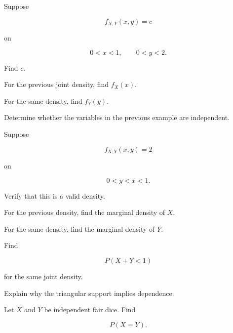\begin{exercise}[2]
Suppose

\[
f_{X,Y}(x,y)=c
\]

on

\[
0<x<1,
\qquad
0<y<2.
\]

Find \(c\).
\end{exercise}

\begin{exercise}[2]
For the previous joint density, find \(f_X(x)\).
\end{exercise}

\begin{exercise}[2]
For the same density, find \(f_Y(y)\).
\end{exercise}

\begin{exercise}[2]
Determine whether the variables in the previous example are independent.
\end{exercise}

\begin{exercise}[2]
Suppose

\[
f_{X,Y}(x,y)=2
\]

on

\[
0<y<x<1.
\]

Verify that this is a valid density.
\end{exercise}

\begin{exercise}[2]
For the previous density, find the marginal density of \(X\).
\end{exercise}

\begin{exercise}[2]
For the same density, find the marginal density of \(Y\).
\end{exercise}

\begin{exercise}[2]
Find

\[
P(X+Y<1)
\]

for the same joint density.
\end{exercise}

\begin{exercise}[2]
Explain why the triangular support implies dependence.
\end{exercise}

\begin{exercise}[2]
Let \(X\) and \(Y\) be independent fair dice. Find

\[
P(X=Y).
\]
\end{exercise}

